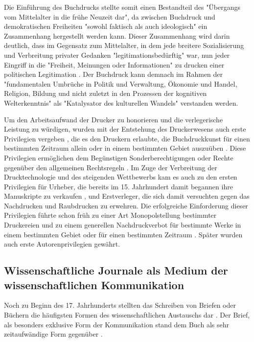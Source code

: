 Die Einführung des Buchdrucks stellte somit einen Bestandteil des "Übergangs vom Mittelalter in die frühe Neuzeit dar"\cite{lange2008medienwettbewerb}, da zwischen Buchdruck und demokratischen Freiheiten "sowohl faktisch als auch ideologisch" \cite{suchen} ein Zusammenhang hergestellt werden kann. Dieser Zusammenhang wird darin deutlich, dass im Gegensatz zum Mittelalter, in dem jede breitere Sozialisierung und Verbreitung privater Gedanken "legitimationsbedürftig" war, nun jeder Eingriff in die "Freiheit, Meinungen oder Informationen" zu drucken einer politischen Legitimation \cite{giesecke_1991_buchdruck}. Der Buchdruck kann demnach im Rahmen der "fundamentalen Umbrüche in Politik und Verwaltung, Ökonomie und Handel, Religion, Bildung und nicht zuletzt in den Prozessen der kognitiven Welterkenntnis" \cite{pscheida_2010_wikipedia} als "Katalysator des kulturellen Wandels"\cite{giesecke_1991_buchdruck} verstanden werden.

Um den Arbeitsaufwand der Drucker zu honorieren und die verlegerische Leistung zu würdigen\cite{szilagyi_2011_leistungsschutzrecht}, wurden mit der Entstehung des Druckerwesens auch erste Privilegien vergeben \cite{gieseke_1995_privileg}, die es den Druckern erlaubte, die Buchdruckkunst für einen bestimmten Zeitraum allein oder in einem bestimmten Gebiet auszuüben \cite{martin2008publizistische} \cite{koller_1995_Urheberrecht}. Diese Privilegien ermöglichen dem Begünstigen Sonderberechtigungen oder Rechte gegenüber den allgemeinen Rechtsregeln \cite{jaenich_2002_geistiges}. Im Zuge der Verbreitung der Drucktechnologie und des steigenden Wettbewerbs kam es auch zu den ersten Privilegien für Urheber, die bereits im 15. Jahrhundert damit begannen ihre Manuskripte zu verkaufen \cite{hesse2002rise}, und Erstverleger, die sich damit versuchten gegen das Nachdrucken und Raubdrucken zu erwehren. Die erfolgreiche Einforderung dieser Privilegien führte schon früh zu einer Art Monopolstellung bestimmter Druckereien und zu einem generellen Nachdruckverbot für bestimmte Werke in einem bestimmten Gebiet oder für einen bestimmten Zeitraum \cite{szilagyi_2011_leistungsschutzrecht} \cite{hesse2002rise}. Später wurden auch erste Autorenprivilegien gewährt.

\subsection{Wissenschaftliche Journale als Medium der wissenschaftlichen Kommunikation}

Noch zu Beginn des 17. Jahrhunderts stellten das Schreiben von Briefen oder Büchern die häufigsten Formen des wissenschaftlichen Austauschs dar \cite{porter_1964_scientific}. Der Brief, als besonders exklusive Form der Kommunikation stand dem Buch als sehr zeitaufwändige Form gegenüber \cite{fecher_hiig_2014}.


